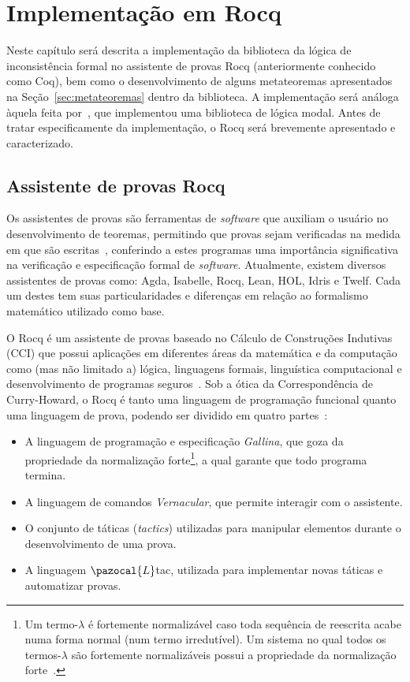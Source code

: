 \chapter{Implementação em Rocq}\label{cap:implementacao}

Neste capítulo será descrita a implementação da biblioteca da lógica de inconsistência formal \lfium{} no assistente de provas Rocq (anteriormente conhecido como Coq), bem como o desenvolvimento de alguns metateoremas apresentados na Seção~\ref{sec:metateoremas} dentro da biblioteca. A implementação será análoga àquela feita por~, que implementou uma biblioteca de lógica modal. Antes de tratar especificamente da implementação, o Rocq será brevemente apresentado e caracterizado.

\section{Assistente de provas Rocq}\label{sec:rocq}
    Os assistentes de provas são ferramentas de \textit{software} que auxiliam o usuário no desenvolvimento de teoremas, permitindo que provas sejam verificadas na medida em que são escritas~\cite{geuvers2009proof}, conferindo a estes programas uma importância significativa na verificação e especificação formal de \textit{software}. Atualmente, existem diversos assistentes de provas como: Agda, Isabelle, Rocq, Lean, HOL, Idris e Twelf. Cada um destes tem suas particularidades e diferenças em relação ao formalismo matemático utilizado como base.

    O Rocq é um assistente de provas baseado no Cálculo de Construções Indutivas (CCI) que possui aplicações em diferentes áreas da matemática e da computação como (mas não limitado a) lógica, linguagens formais, linguística computacional e desenvolvimento de programas seguros~\cite{coqart}. Sob a ótica da Correspondência de Curry{-}Howard, o Rocq é tanto uma linguagem de programação funcional quanto uma linguagem de prova, podendo ser dividido em quatro partes~\cite{silva2019certificaccao}:
    
    \begin{itemize}
        \item A linguagem de programação e especificação \textit{Gallina}, que goza da propriedade da normalização forte\footnote{Um termo-$\lambda$ é fortemente normalizável caso toda sequência de reescrita acabe numa forma normal (num termo irredutível). Um sistema no qual todos os termos-$\lambda$ são fortemente normalizáveis possui a propriedade da normalização forte~\cite{nipkow2006rewriting}.}, a qual garante que todo programa termina.
        \item A linguagem de comandos \textit{Vernacular}, que permite interagir com o assistente.
        \item O conjunto de táticas (\textit{tactics}) utilizadas para manipular elementos durante o desenvolvimento de uma prova.
        \item A linguagem $\pazocal{L}$tac, utilizada para implementar novas táticas e automatizar provas.
    \end{itemize}


